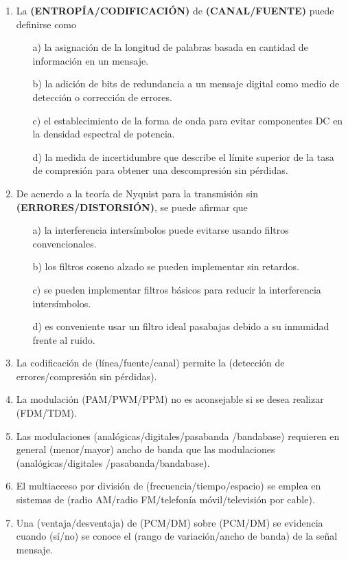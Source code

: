 \begin{enumerate}
\begin{enumerate}
\begin{enumerate}
			\item La \textbf{(ENTROPÍA/CODIFICACIÓN)} de \textbf{(CANAL/FUENTE)} puede definirse como
			\begin{enumerate}
				\item[a)]	la asignación de la longitud de palabras basada en cantidad de información en un mensaje.
				\item[b)]	la adición de bits de redundancia a un mensaje digital como medio de detección o corrección de errores.
				\item[c)]	el establecimiento de la forma de onda para evitar componentes DC en la densidad espectral de potencia.
				\item[d)]	la medida de incertidumbre que describe el límite superior de la tasa de compresión para obtener una descompresión sin pérdidas.
			\end{enumerate}
			
			\item De acuerdo a la teoría de Nyquist para la transmisión sin \textbf{(ERRORES/DISTORSIÓN)}, se puede afirmar que
			\begin{enumerate}
				\item[a)]	la interferencia intersímbolos puede evitarse usando filtros convencionales.
				\item[b)]	los filtros coseno alzado se pueden implementar sin retardos.
				\item[c)]	se pueden implementar filtros básicos para reducir la interferencia intersímbolos.
				\item[d)]	es conveniente usar un filtro ideal pasabajas debido a su inmunidad frente al ruido. 
			\end{enumerate}
			\item La codificación de (línea/fuente/canal) permite la (detección de errores/compresión sin pérdidas).
			\item La modulación (PAM/PWM/PPM) no es aconsejable si se desea realizar (FDM/TDM).
			\item Las modulaciones (analógicas/digitales/pasabanda
			/bandabase) requieren en general (menor/mayor) ancho de banda que las modulaciones (analógicas/digitales
			/pasabanda/bandabase).
			\item El multiacceso por división de (frecuencia/tiempo/espacio) se emplea en sistemas de (radio AM/radio FM/telefonía móvil/televisión por cable).
			\item Una (ventaja/desventaja) de (PCM/DM) sobre (PCM/DM) se evidencia cuando (sí/no) se conoce el (rango de variación/ancho de banda) de la señal mensaje.
		\end{enumerate}
		

\end{enumerate}
\end{enumerate}
